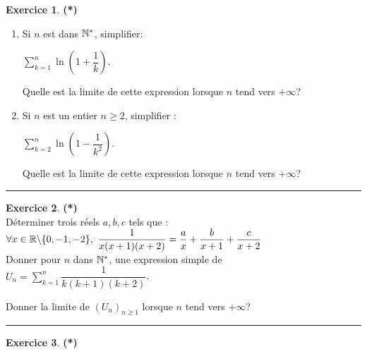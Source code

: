 \documentclass[a4paper,11pt]{article}
\theoremstyle{definition}
\newtheorem{exo}{Exercice} %
\begin{document}
\begin{minipage}[c]{1\linewidth}
	\begin{minipage}[c]{0.48\linewidth}
		\raggedright
		
		
		
		
		\begin{exo}\textbf{(*)}\quad\\[0.2cm]
			\begin{enumerate}
				\item Si $n$ est dans $\mathbb{N}^*$, simplifier:
				
				\centering$\displaystyle\sum\limits_{k=1}^{n}{\ln\left(1+\dfrac{1}{k}\right)}$.
				
				\raggedright Quelle est la limite de cette expression lorsque $n$ tend vers $+\infty$?
				
				\item Si $n$ est un entier $n \geq 2$, simplifier :
				
				\centering$\displaystyle\sum\limits_{k=2}^{n}{\ln\left(1-\dfrac{1}{k^2}\right)}$.
				
				\raggedright Quelle est la limite de cette expression lorsque $n$ tend vers $+\infty$?
			\end{enumerate}
			
			
			\centering
			\rule{1\linewidth}{0.6pt}
		\end{exo}
		
		
		
		\begin{exo}\textbf{(*)}\quad\\[0.2cm]
			Déterminer trois réels $a, b, c$ tels que :\quad\\[0.25cm]
			
			\centering$\forall x\in\R\backslash\{0,-1,-2\},\ \dfrac{1}{x(x+1)(x+2)} = \dfrac{a}{x} + \dfrac{b}{x+1} + \dfrac{c}{x+2}$\quad\\[0.25cm]
			
			Donner pour $n$ dans $\mathbb{N}^*$, une expression simple de\quad\\[0.25cm]
			
			\centering$ U_n = \displaystyle\sum\limits_{k=1}^{n}{\dfrac{1}{k(k+1)(k+2)}}$.\quad\\[0.25cm]
			
			\raggedright Donner la limite de $(U_n)_{n\geq 1}$ lorsque $n$ tend vers $+\infty$?
			
			\centering
			\rule{1\linewidth}{0.6pt}
		\end{exo}
		
		\begin{exo}\textbf{(*)}\quad\\[0.2cm]
			

\end{exo}
\end{minipage}
\end{minipage}
\end{document}
